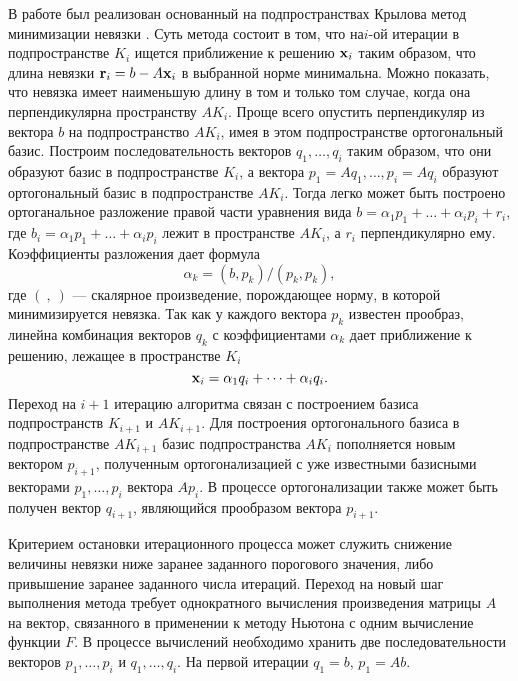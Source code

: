 \def\r{\mathbf{r}}
В работе был реализован основанный на подпространствах Крылова метод минимизации невязки \cite{EEbook}. Суть метода состоит в том, что на$i$-ой итерации в подпространстве $K_i$ ищется приближение к решению $\mathbf{x}_i$ таким образом, что длина невязки $\r_i = b - A\x_i$ в выбранной норме минимальна. Можно показать, что невязка имеет наименьшую длину в том и только том случае, когда она перпендикулярна пространству $AK_i$. Проще всего опустить перпендикуляр из вектора $b$ на подпространство $AK_i$, имея в этом подпространстве ортогональный базис. Построим последовательность векторов $q_1, \dots, q_i$ таким образом, что они образуют базис в подпространстве $K_i$, а вектора $p_1 = Aq_1, \dots, p_i = Aq_i$ образуют ортогональный базис в подпространстве $AK_i$. Тогда легко может быть построено ортоганальное разложение правой части уравнения вида $b = \alpha_1 p_1 + \dots + \alpha_i p_i + r_i$, где $b_i =  \alpha_1 p_1 + \dots + \alpha_i p_i$ лежит в пространстве $AK_i$, а $r_i$ перпендикулярно ему. Коэффициенты разложения дает формула
\begin{equation}
\alpha_k = (b,p_k) / (p_k, p_k),
\end{equation}
где $(\ ,\ )$ ---  скалярное произведение, порождающее норму, в которой минимизируется невязка. 
Так как у каждого вектора $p_k$ известен прообраз, линейна комбинация векторов $q_k$ с коэффициентами $\alpha_k$ дает приближение к решению, лежащее в пространстве $K_i$
\begin{equation}
\mathbf{x}_i = \alpha_1 q_i + \dots + \alpha_i q_i. 
\end{equation}
Переход на $i+1$ итерацию алгоритма связан с построением базиса подпространств $K_{i+1}$ и $AK_{i+1}$. Для построения ортогонального базиса в подпространстве $AK_{i+1}$ базис подпространства $AK_i$ пополняется новым вектором $p_{i+1}$, полученным ортогонализацией с уже известными базисными векторами $p_1, \dots, p_i$ вектора $Ap_i$. В процессе ортогонализации также может быть получен вектор $q_{i+1}$, являющийся прообразом вектора $p_{i+1}$. 

Критерием остановки итерационного процесса может служить снижение величины невязки ниже заранее заданного порогового значения, либо привышение заранее заданного числа итераций. Переход на новый шаг выполнения метода требует однократного вычисления произведения матрицы $A$ на вектор, связанного в применении к методу Ньютона с одним вычисление функции $F$. В процессе вычислений необходимо хранить две последовательности векторов $p_1, \dots, p_i$ и $q_1, \dots, q_i$. На первой итерации $q_1 = b$, $p_1 = Ab$. 

